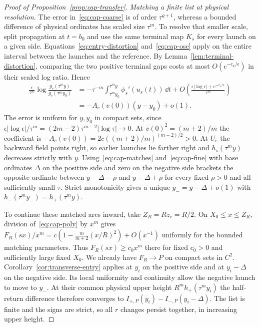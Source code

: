 \begin{proof}[Proof of Proposition~\ref{prop:cap-transfer}]
\emph{Matching a finite list at physical resolution.}
The error in~\eqref{eq:cap-coarse} is of order $\tau^{g+1}$, whereas a
bounded difference of physical ordinates has scaled size $\tau^m$.
To resolve that smaller scale, split propagation at $t=b_0$ and use
the same terminal map $K_s$ for every launch on a given side.
Equations~\eqref{eq:entry-distortion} and~\eqref{eq:cap-osc} apply on the
entire interval between the launches and the reference. By
Lemma~\ref{lem:terminal-distortion}, comparing the two positive terminal
gaps costs at most $O(e^{-c_4/\epsilon})$ in their scaled log ratio. Hence
\begin{align}
 \frac{\epsilon}{\tau^m}\log\frac{g_s(\tau^m y)}{g_s(\tau^m y_0)}
 &= -\tau^{-m}\int_{\tau^m y_0}^{\tau^m y}\phi_s'(u_s(t))\,\dd t
       +O\!\left(\frac{\epsilon|\log\epsilon|+e^{-c_4/\epsilon}}{\tau^m}\right)
       \nonumber\\
 &= -A_c(v(0))(y-y_0)+o(1).\label{eq:cap-fine}
\end{align}
The error is uniform for $y,y_0$ in compact sets,
since $\epsilon|\log\epsilon|/\tau^m=(2m-2)\tau^{m-2}|\log\tau|\to0$.
At $v(0)^2=(m+2)/m$ the coefficient is
$-A_c(v(0))=2c((m+2)/m)^{(m-2)/2}>0$.
At $U_e$ the backward field points right, so earlier launches lie
farther right and $h_s(\tau^m y)$ decreases strictly with $y$.
Using~\eqref{eq:cap-matches} and~\eqref{eq:cap-fine} with base ordinates
$\Delta$ on the positive side and zero on the negative side brackets
the opposite ordinate between $y-\Delta-\rho$ and $y-\Delta+\rho$ for
every fixed $\rho>0$ and all sufficiently small $\tau$.
Strict monotonicity gives a unique $y_-=y-\Delta+o(1)$ with
$h_-(\tau^m y_-)=h_+(\tau^m y)$.

To continue these matched arcs inward, take $Z_R=R z_e=R/2$.
On $X_0\le x\le Z_R$, division of~\eqref{eq:cap-poly} by $x^m$ gives
$F_R(sx)/x^m=c(1-\tfrac{m}{m+2}(x/R)^2)+O(x^{-1})$ uniformly
for the bounded matching parameters. Thus $F_R(sx)\ge c_0x^m$ there
for fixed $c_0>0$ and sufficiently large fixed $X_0$.
We already have $F_R\to P$ on compact sets in $C^2$.
Corollary~\ref{cor:transverse-entry} applies at $y_i$ on the positive
side and at $y_i-\Delta$ on the negative side. Its local uniformity
and continuity allow the negative launch to move to $y_-$.
At their common physical upper height $R^m h_+(\tau^m y_i)$ the
half-return difference therefore converges to
$I_{+,P}(y_i)-I_{-,P}(y_i-\Delta)$. The list is finite and the signs
are strict, so all $r$ changes persist together, in increasing upper height.


\end{proof}
